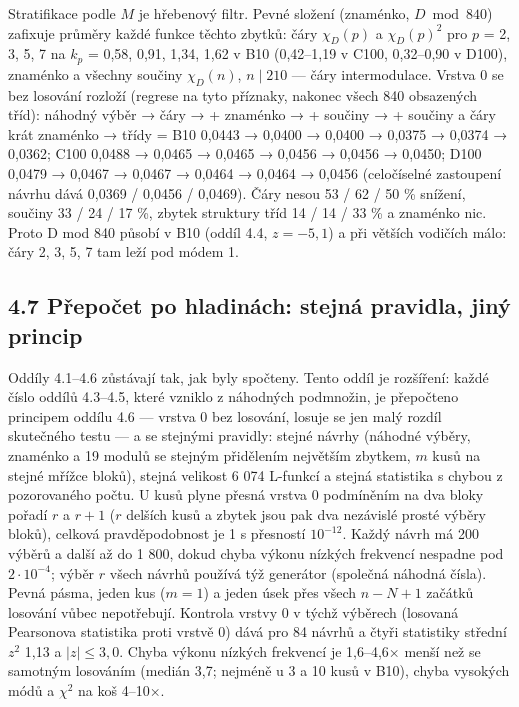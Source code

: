 \documentclass[
  10pt,
]{article}
\begin{document}
Stratifikace podle \(M\) je hřebenový filtr. Pevné složení (znaménko,
\(D \bmod 840\)) zafixuje průměry každé funkce těchto zbytků: čáry
\(\chi_D(p)\) a \(\chi_D(p)^2\) pro \(p\) = 2, 3, 5, 7 na \(k_p\) =
0,58, 0,91, 1,34, 1,62 v B10 (0,42--1,19 v C100, 0,32--0,90 v D100),
znaménko a všechny součiny \(\chi_D(n)\), \(n \mid 210\) --- čáry
intermodulace. Vrstva 0 se bez losování rozloží (regrese na tyto
příznaky, nakonec všech 840 obsazených tříd): náhodný výběr → čáry → +
znaménko → + součiny → + součiny a čáry krát znaménko → třídy = B10
0,0443 → 0,0400 → 0,0400 → 0,0375 → 0,0374 → 0,0362; C100 0,0488 →
0,0465 → 0,0465 → 0,0456 → 0,0456 → 0,0450; D100 0,0479 → 0,0467 →
0,0467 → 0,0464 → 0,0464 → 0,0456 (celočíselné zastoupení návrhu dává
0,0369 / 0,0456 / 0,0469). Čáry nesou 53 / 62 / 50 \% snížení, součiny
33 / 24 / 17 \%, zbytek struktury tříd 14 / 14 / 33 \% a znaménko nic.
Proto D mod 840 působí v B10 (oddíl 4.4, \(z = -5{,}1\)) a při větších
vodičích málo: čáry 2, 3, 5, 7 tam leží pod módem 1.

\hypertarget{pux159epoux10det-po-hladinuxe1ch-stejnuxe1-pravidla-jinuxfd-princip}{%
\subsection{4.7 Přepočet po hladinách: stejná pravidla, jiný
princip}\label{pux159epoux10det-po-hladinuxe1ch-stejnuxe1-pravidla-jinuxfd-princip}}

Oddíly 4.1--4.6 zůstávají tak, jak byly spočteny. Tento oddíl je
rozšíření: každé číslo oddílů 4.3--4.5, které vzniklo z náhodných
podmnožin, je přepočteno principem oddílu 4.6 --- vrstva 0 bez losování,
losuje se jen malý rozdíl skutečného testu --- a se stejnými pravidly:
stejné návrhy (náhodné výběry, znaménko a 19 modulů se stejným
přidělením největším zbytkem, \(m\) kusů na stejné mřížce bloků), stejná
velikost 6 074 L-funkcí a stejná statistika s chybou z pozorovaného
počtu. U kusů plyne přesná vrstva 0 podmíněním na dva bloky pořadí \(r\)
a \(r + 1\) (\(r\) delších kusů a zbytek jsou pak dva nezávislé prosté
výběry bloků), celková pravděpodobnost je 1 s přesností \(10^{-12}\).
Každý návrh má 200 výběrů a další až do 1 800, dokud chyba výkonu
nízkých frekvencí nespadne pod \(2\cdot10^{-4}\); výběr \(r\) všech
návrhů používá týž generátor (společná náhodná čísla). Pevná pásma,
jeden kus (\(m = 1\)) a jeden úsek přes všech \(n - N + 1\) začátků
losování vůbec nepotřebují. Kontrola vrstvy 0 v týchž výběrech (losovaná
Pearsonova statistika proti vrstvě 0) dává pro 84 návrhů a čtyři
statistiky střední \(z^2\) 1,13 a \(|z| \le 3{,}0\). Chyba výkonu
nízkých frekvencí je 1,6--4,6× menší než se samotným losováním (medián
3,7; nejméně u 3 a 10 kusů v B10), chyba vysokých módů a \(\chi^2\) na
koš 4--10×.
\end{document}
